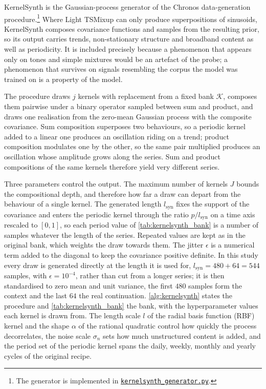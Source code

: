 

\medskip

KernelSynth is the Gaussian-process generator of the Chronos data-generation procedure\autocite{ansariChronosLearningLanguage2024}.\footnote{The generator is implemented in \href{https://github.com/FedericoSabbadini/patchAliasing/blob/main/notebooks/data/synthetic/generators/kernelsynth_generator.py}{\texttt{kernelsynth\_generator.py}}.} Where Light TSMixup can only produce superpositions of sinusoids, KernelSynth composes covariance functions and samples from the resulting prior, so its output carries trends, non-stationary structure and broadband content as well as periodicity. It is included precisely because a phenomenon that appears only on tones and simple mixtures would be an artefact of the probe; a phenomenon that survives on signals resembling the corpus the model was trained on is a property of the model.

The procedure draws $j$ kernels with replacement from a fixed bank $\mathcal K$, composes them pairwise under a binary operator sampled between sum and product, and draws one realisation from the zero-mean Gaussian process with the composite covariance. Sum composition superposes two behaviours, so a periodic kernel added to a linear one produces an oscillation riding on a trend; product composition modulates one by the other, so the same pair multiplied produces an oscillation whose amplitude grows along the series. Sum and product compositions of the same kernels therefore yield very different series.

Three parameters control the output. The maximum number of kernels $J$ bounds the compositional depth, and therefore how far a draw can depart from the behaviour of a single kernel. The generated length $l_{\mathrm{syn}}$ fixes the support of the covariance and enters the periodic kernel through the ratio $p/l_{\mathrm{syn}}$ on a time axis rescaled to $[0,1]$, so each period value of \autoref{tab:kernelsynth_bank} is a number of samples whatever the length of the series. Repeated values are kept as in the original bank, which weights the draw towards them. The jitter $\epsilon$ is a numerical term added to the diagonal to keep the covariance positive definite. In this study every draw is generated directly at the length it is used for, $l_{\mathrm{syn}}=480+64=544$ samples, with $\epsilon=10^{-4}$, rather than cut from a longer series; it is then standardised to zero mean and unit variance, the first $480$ samples form the context and the last $64$ the real continuation\@. \autoref{alg:kernelsynth} states the procedure and \autoref{tab:kernelsynth_bank} the bank, with the hyperparameter values each kernel is drawn from. The length scale $l$ of the radial basis function (RBF) kernel and the shape $\alpha$ of the rational quadratic control how quickly the process decorrelates, the noise scale $\sigma_n$ sets how much unstructured content is added, and the period set of the periodic kernel spans the daily, weekly, monthly and yearly cycles of the original recipe.


